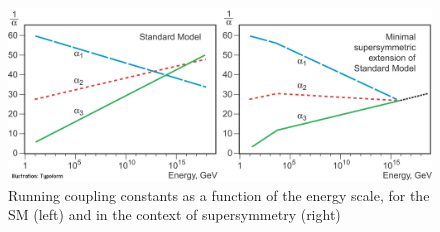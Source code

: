 \begin{figure} [htb!]
\begin{center}
\includegraphics[scale=0.7]{figs/coupling_constants.jpg}
\caption{Running coupling constants as a function of the energy scale, for the SM (left) and in the context of supersymmetry (right)~\cite{CouplingConstants} \label{fig:constants}}
\end{center}
\end{figure}
 
